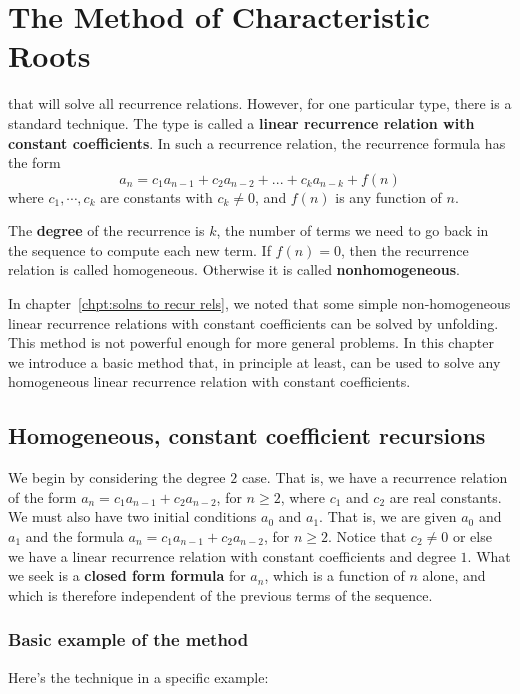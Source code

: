 \chapter{The Method of Characteristic Roots}\label{chpt:char roots}

 that will solve all recurrence relations. However, for one
particular type, there is a standard technique. The type is called a 
{\bf linear recurrence relation with constant coefficients}. In 
such a recurrence relation, the recurrence formula has the form
$$
a_n=c_1a_{n-1}+c_2a_{n-2}+...+c_ka_{n-k}+ f(n)
$$
where $c_1,\cdots,c_k$ are constants with $c_k\not=0$, and $f(n)$ is any function
of $n$.

The {\bfseries degree} of the recurrence is $k$, the number of terms we need to go back
in the sequence to compute each new term. If $f(n)=0$, then the recurrence relation
is called homogeneous. Otherwise it is called {\bfseries nonhomogeneous}.


In chapter~\ref{chpt:solns to recur rels}, we noted that some simple non-homogeneous 
linear recurrence relations with constant coefficients can be solved by unfolding.
This method is not powerful enough for more general problems. In this chapter we introduce a basic 
method that, in principle at least, can  be used to  solve any homogeneous linear recurrence relation 
with constant coefficients. 

\section{Homogeneous, constant coefficient recursions}
We begin by considering the degree $2$ case. That is, we have a recurrence relation of the form 
$a_n=c_1a_{n-1}+c_2a_{n-2}$, for $n\geq 2$, where $c_1$ and $c_2$ are real constants.
We must also have two initial conditions $a_0$ and $a_1$. That is, we are given 
$a_0$ and $a_1$ and the formula $a_n=c_1a_{n-1}+c_2a_{n-2}$, for $n\geq 2$. 
Notice that $c_2\neq 0$ or else we have a linear recurrence relation with constant coefficients 
and degree $1$. What we seek is a {\bf closed form formula} for $a_n$, which is a function
of $n$ alone, and which is therefore independent of the previous terms of the sequence.


\subsection{Basic example of the method}
Here's the technique in a specific example:

